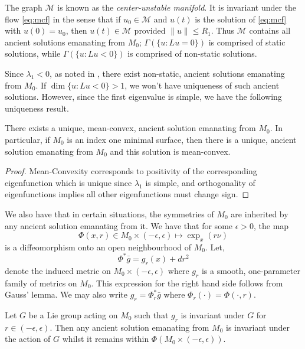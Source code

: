 \documentclass{amsart}
\begin{document}
The graph \(\mathcal{M}\) is known as the \emph{center-unstable manifold}. It is invariant under the flow \eqref{eq:mcf} in the sense that if \(u_0 \in \mathcal{M}\) and \(u(t)\) is the solution of \eqref{eq:mcf} with \(u(0) = u_0\), then \(u(t) \in \mathcal{M}\) provided \(\|u\| \leq R_1\). Thus \(\mathcal{M}\) contains all ancient solutions emanating from \(M_0\); \(\Gamma(\{u : Lu = 0\})\) is comprised of static solutions, while \(\Gamma(\{u : Lu < 0\})\) is comprised of non-static solutions.

Since \(\lambda_1 < 0\), as noted in , there exist non-static, ancient solutions emanating from \(M_0\). If \(\dim \{u : L u < 0\} > 1\), we won't have uniqueness of such ancient solutions. However, since the first eigenvalue is simple, we have the following uniqueness result.

\begin{thm}
\label{thm:ancient_meanconvex_uniqueness}
There exists a unique, mean-convex, ancient solution emanating from \(M_0\). In particular, if \(M_0\) is an index one minimal surface, then there is a unique, ancient solution emanating from \(M_0\) and this solution is mean-convex.
\end{thm}

\begin{proof}
Mean-Convexity corresponds to positivity of the corresponding eigenfunction which is unique since \(\lambda_1\) is simple, and orthogonality of eigenfunctions implies all other eigenfunctions must change sign.
\end{proof}

We also have that in certain situations, the symmetries of \(M_0\) are inherited by any ancient solution emanating from it. We have that for some \(\epsilon > 0\), the map
\[
\Phi (x, r) \in M_0 \times (-\epsilon, \epsilon) \mapsto \exp_x(r\nu)
\]
is a diffeomorphism onto an open neighbourhood of \(M_0\). Let,
\[
\Phi^{\ast} \bar{g} = g_r(x) + dr^2
\]
denote the induced metric on \(M_0 \times (-\epsilon, \epsilon)\) where \(g_r\) is a smooth, one-parameter family of metrics on \(M_0\). This expression for the right hand side follows from Gauss' lemma. We may also write \(g_r = \Phi_r^{\ast} \bar{g}\) where \(\Phi_r (\cdot) = \Phi(\cdot, r)\).

\begin{thm}
Let \(G\) be a Lie group acting on \(M_0\) such that \(g_r\) is invariant under \(G\) for \(r \in (-\epsilon, \epsilon)\). Then any ancient solution emanating from \(M_0\) is invariant under the action of \(G\) whilst it remains within \(\Phi(M_0 \times (-\epsilon, \epsilon))\).
\end{thm}
\end{document}
